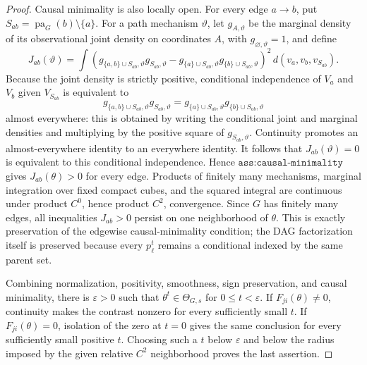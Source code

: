 \documentclass{article}
\begin{document}
\begin{proof}
Causal minimality is also locally open. For every edge \(a\to b\), put \(S_{ab}=\operatorname{pa}_G(b)\setminus\{a\}\). For a path mechanism \(\vartheta\), let \(g_{A,\vartheta}\) be the marginal density of its observational joint density on coordinates \(A\), with \(g_{\varnothing,\vartheta}=1\), and define
\[
 J_{ab}(\vartheta)
 =\int
 \left(g_{\{a,b\}\cup S_{ab},\vartheta}g_{S_{ab},\vartheta}
       -g_{\{a\}\cup S_{ab},\vartheta}g_{\{b\}\cup S_{ab},\vartheta}\right)^2
 \,d(v_a,v_b,v_{S_{ab}}).
\]
Because the joint density is strictly positive, conditional independence of \(V_a\) and \(V_b\) given \(V_{S_{ab}}\) is equivalent to
\[
 g_{\{a,b\}\cup S_{ab},\vartheta}g_{S_{ab},\vartheta}
 =g_{\{a\}\cup S_{ab},\vartheta}g_{\{b\}\cup S_{ab},\vartheta}
\]
almost everywhere: this is obtained by writing the conditional joint and marginal densities and multiplying by the positive square of \(g_{S_{ab},\vartheta}\). Continuity promotes an almost-everywhere identity to an everywhere identity. It follows that \(J_{ab}(\vartheta)=0\) is equivalent to this conditional independence. Hence \(\texttt{ass:causal-minimality}\) gives \(J_{ab}(\theta)>0\) for every edge. Products of finitely many mechanisms, marginal integration over fixed compact cubes, and the squared integral are continuous under product \(C^0\), hence product \(C^2\), convergence. Since \(G\) has finitely many edges, all inequalities \(J_{ab}>0\) persist on one neighborhood of \(\theta\). This is exactly preservation of the edgewise causal-minimality condition; the DAG factorization itself is preserved because every \(p_\ell^t\) remains a conditional indexed by the same parent set.

Combining normalization, positivity, smoothness, sign preservation, and causal minimality, there is \(\varepsilon>0\) such that \(\theta^t\in\Theta_{G,s}\) for \(0\le t<\varepsilon\). If \(F_{ji}(\theta)\ne0\), continuity makes the contrast nonzero for every sufficiently small \(t\). If \(F_{ji}(\theta)=0\), isolation of the zero at \(t=0\) gives the same conclusion for every sufficiently small positive \(t\). Choosing such a \(t\) below \(\varepsilon\) and below the radius imposed by the given relative \(C^2\) neighborhood proves the last assertion.


\end{proof}
\end{document}
